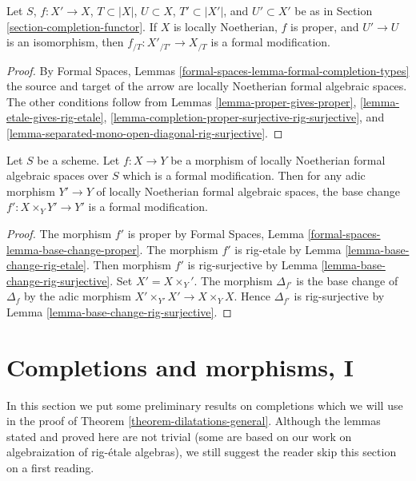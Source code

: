 \begin{lemma}
\label{lemma-modification-gives-formal-modification}
Let $S$, $f : X' \to X$, $T \subset |X|$, $U \subset X$,
$T' \subset |X'|$, and $U' \subset X'$ be as in
Section \ref{section-completion-functor}.
If $X$ is locally Noetherian, $f$ is proper, and $U' \to U$ is an isomorphism,
then $f_{/T} : X'_{/T'} \to X_{/T}$ is a formal modification.
\end{lemma}

\begin{proof}
By Formal Spaces, Lemmas \ref{formal-spaces-lemma-formal-completion-types}
the source and target of the arrow are locally Noetherian
formal algebraic spaces.
The other conditions follow from
Lemmas \ref{lemma-proper-gives-proper},
\ref{lemma-etale-gives-rig-etale},
\ref{lemma-completion-proper-surjective-rig-surjective}, and
\ref{lemma-separated-mono-open-diagonal-rig-surjective}.
\end{proof}

\begin{lemma}
\label{lemma-base-change-formal-modification}
Let $S$ be a scheme. Let $f : X \to Y$ be a morphism of locally Noetherian
formal algebraic spaces over $S$ which is a formal modification.
Then for any adic morphism $Y' \to Y$ of locally Noetherian formal
algebraic spaces, the base change $f' : X \times_Y Y' \to Y'$ is
a formal modification.
\end{lemma}

\begin{proof}
The morphism $f'$ is proper by
Formal Spaces, Lemma \ref{formal-spaces-lemma-base-change-proper}.
The morphism $f'$ is rig-etale by
Lemma \ref{lemma-base-change-rig-etale}.
Then morphism $f'$ is rig-surjective by
Lemma \ref{lemma-base-change-rig-surjective}. Set $X' = X \times_ Y'$.
The morphism $\Delta_{f'}$ is the base change of
$\Delta_f$ by the adic morphism $X' \times_{Y'} X' \to X \times_Y X$.
Hence $\Delta_{f'}$ is rig-surjective by
Lemma \ref{lemma-base-change-rig-surjective}.
\end{proof}









\section{Completions and morphisms, I}
\label{section-completion-and-morphisms}

\noindent
In this section we put some preliminary results on completions
which we will use in the proof of Theorem \ref{theorem-dilatations-general}.
Although the lemmas stated and proved here are not trivial
(some are based on our work on algebraization of rig-\'etale algebras),
we still suggest the reader skip this section on a first reading.

